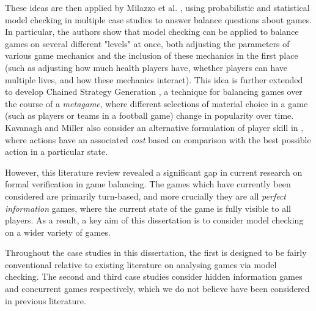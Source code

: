 These ideas are then applied by Milazzo et al. \cite{milazzo_case_2015}, using probabilistic and statistical model checking in multiple case studies to answer balance questions about games. In particular, the authors show that model checking can be applied to balance games on several different "levels" at once, both adjusting the parameters of various game mechanics and the inclusion of these mechanics in the first place (such as adjusting how much health players have, whether players can have multiple lives, and how these mechanics interact). This idea is further extended to develop Chained Strategy Generation \cite{kavanagh_balancing_2019}, a technique for balancing games over the course of a \emph{metagame}, where different selections of material choice in a game (such as players or teams in a football game) change in popularity over time. Kavanagh and Miller also consider an alternative formulation of player skill in \cite{kavanagh_gameplay_2020}, where actions have an associated \emph{cost} based on comparison with the best possible action in a particular state.

However, this literature review revealed a significant gap in current research on formal verification in game balancing. The games which have currently been considered are primarily turn-based, and more crucially they are all \emph{perfect information} games, where the current state of the game is fully visible to all players. As a result, a key aim of this dissertation is to consider model checking on a wider variety of games.

Throughout the case studies in this dissertation, the first is designed to be fairly conventional relative to existing literature on analysing games via model checking. The second and third case studies consider hidden information games and concurrent games respectively, which we do not believe have been considered in previous literature.
